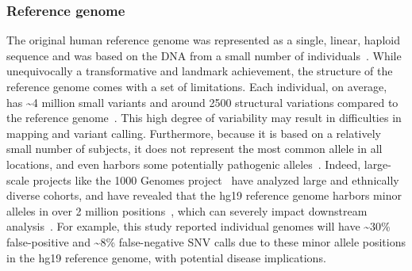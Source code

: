 \subsubsection{Reference genome}
The original human reference genome was represented as a single, linear, haploid sequence and was based on the DNA from a small number of individuals~\cite{venter2001sequence}.
While unequivocally a transformative and landmark achievement, the structure of the reference genome comes with a set of limitations. Each individual, on average, has \textasciitilde{}4 million small variants and around 2500 structural variations compared to the reference genome~\cite{10002015global, sudmant2015integrated}.
This high degree of variability may result in difficulties in mapping and variant calling. Furthermore, because it is based on a relatively small number of subjects, it does not represent the most common allele in all locations, and even harbors some potentially pathogenic alleles~\cite{barbitoff2018catching,koko2018challenges,ferrarini2015use}.
Indeed, large-scale projects like the 1000 Genomes project~\cite{10002010map} have analyzed large and ethnically diverse cohorts, and have revealed that the hg19 reference genome harbors minor alleles in over 2 million positions~\cite{10002015global}, which can severely impact downstream analysis~\cite{karthikeyan2017hg19k}.
For example, this study reported individual genomes will have \textasciitilde{}30\% false-positive and \textasciitilde{}8\% false-negative SNV calls due to these minor allele positions in the hg19 reference genome, with potential disease implications.

